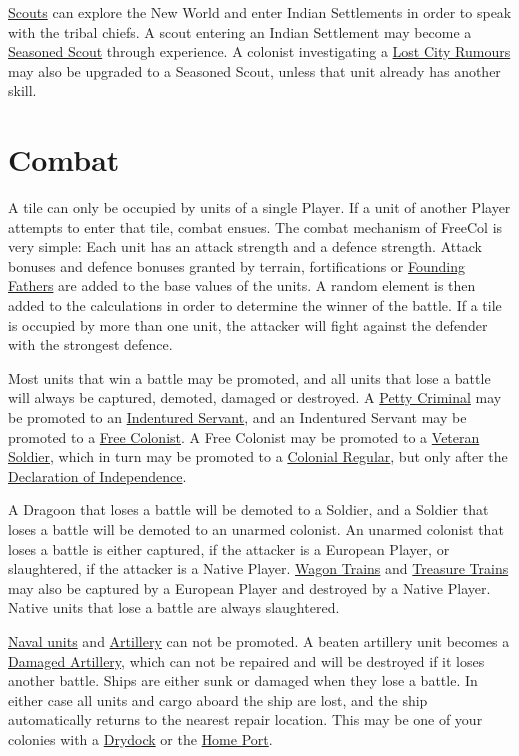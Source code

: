 \documentclass[12pt]{book}
\begin{document}
\hyperlink{Scout}{Scouts} can explore the New World and enter Indian
Settlements in order to speak with the tribal chiefs. A scout entering
an Indian Settlement may become a \hyperlink{Seasoned Scout}{Seasoned
Scout} through experience. A colonist investigating a \hyperlink{Lost
City Rumours}{Lost City Rumours} may also be upgraded to a Seasoned
Scout, unless that unit already has another skill.


\hypertarget{Combat}{\section{Combat}}

A tile can only be occupied by units of a single Player. If a unit of
another Player attempts to enter that tile, combat ensues. The combat
mechanism of FreeCol is very simple: Each unit has an attack strength
and a defence strength. Attack bonuses and defence bonuses granted by
terrain, fortifications or \hyperlink{Founding Fathers}{Founding
  Fathers} are added to the base values of the units. A random element
is then added to the calculations in order to determine the winner of
the battle. If a tile is occupied by more than one unit, the attacker
will fight against the defender with the strongest defence.

Most units that win a battle may be \hypertarget{promotion}{promoted},
and all units that lose a battle will always be captured, demoted,
damaged or destroyed. A \hyperlink{Petty Criminal}{Petty Criminal} may
be promoted to an \hyperlink{Indentured Servant}{Indentured Servant},
and an Indentured Servant may be promoted to a \hyperlink{Free
  Colonist}{Free Colonist}. A Free Colonist may be promoted to a
\hyperlink{Veteran Soldier}{Veteran Soldier}, which in turn may be
promoted to a \hyperlink{Colonial Regular}{Colonial Regular}, but only
after the \hyperlink{Declaration of Independence}{Declaration of
  Independence}.

A Dragoon that loses a battle will be demoted to a Soldier, and a
Soldier that loses a battle will be demoted to an unarmed colonist. An
unarmed colonist that loses a battle is either captured, if the
attacker is a European Player, or slaughtered, if the attacker is a
Native Player. \hyperlink{Wagon Train}{Wagon Trains} and
\hyperlink{Treasure Train}{Treasure Trains} may also be captured by a
European Player and destroyed by a Native Player. Native units that
lose a battle are always slaughtered.

\hyperlink{Naval Units}{Naval units} and
\hyperlink{Artillery}{Artillery} can not be promoted. A beaten
artillery unit becomes a \hyperlink{Damaged Artillery}{Damaged
Artillery}, which can not be repaired and will be destroyed if it
loses another battle. Ships are either sunk or damaged when they lose
a battle. In either case all units and cargo aboard the ship are lost,
and the ship automatically returns to the nearest repair
location. This may be one of your colonies with a
\hyperlink{Drydock}{Drydock} or the \hyperlink{Home Port}{Home Port}.
\end{document}
